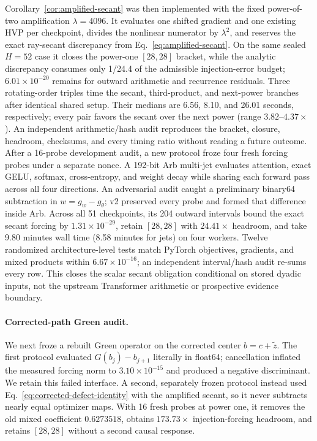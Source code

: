 \documentclass{article}
\begin{document}
Corollary~\ref{cor:amplified-secant} was then implemented with the fixed
power-of-two amplification $\lambda=4096$.  It evaluates one shifted gradient
and one existing HVP per checkpoint, divides the nonlinear numerator by
$\lambda^2$, and reserves the exact ray-secant discrepancy from
Eq.~\eqref{eq:amplified-secant}.  On the same sealed $H=52$ case it closes the
power-one $[28,28]$ bracket, while the analytic discrepancy consumes only
1/24.4 of the admissible injection-error budget; $6.01\times10^{-20}$ remains
for outward arithmetic and recurrence residuals.  Three rotating-order triples
time the secant, third-product, and next-power branches after identical shared
setup.  Their medians are 6.56, 8.10, and 26.01 seconds, respectively; every
pair favors the secant over the next power (range $3.82$--$4.37\times$).
An independent arithmetic/hash audit reproduces the bracket, closure,
headroom, checksums, and every timing ratio without reading a future outcome.
After a 16-probe development audit, a new protocol froze four fresh forcing
probes under a separate nonce.  A 192-bit Arb multi-jet evaluates attention,
exact GELU, softmax, cross-entropy, and weight decay while sharing each forward
pass across all four directions.  An adversarial audit caught a preliminary
binary64 subtraction in $w=g_w-g_\theta$; v2 preserved every probe and formed
that difference inside Arb.  Across all 51 checkpoints, its 204 outward
intervals bound the exact secant forcing by $1.31\times10^{-29}$, retain
$[28,28]$ with $24.41\times$ headroom, and take 9.80 minutes wall time (8.58
minutes for jets) on four workers.  Twelve randomized architecture-level tests
match PyTorch objectives, gradients, and mixed products within
$6.67\times10^{-16}$; an independent interval/hash audit re-sums every row.
This closes the scalar secant obligation conditional on stored dyadic inputs,
not the upstream Transformer arithmetic or prospective evidence boundary.

\paragraph{Corrected-path Green audit.}
We next froze a rebuilt Green operator on the corrected center
$b=c+\widetilde z$.  The first protocol evaluated
$G(b_j)-b_{j+1}$ literally in float64; cancellation inflated the measured
forcing norm to $3.10\times10^{-15}$ and produced a negative discriminant.
We retain this failed interface.  A second, separately frozen protocol instead
used Eq.~\eqref{eq:corrected-defect-identity} with the amplified secant, so it
never subtracts nearly equal optimizer maps.  With 16 fresh probes at power
one, it removes the old mixed coefficient $0.6273518$, obtains
$173.73\times$ injection-forcing headroom, and retains $[28,28]$ without a
second causal response.
\end{document}
